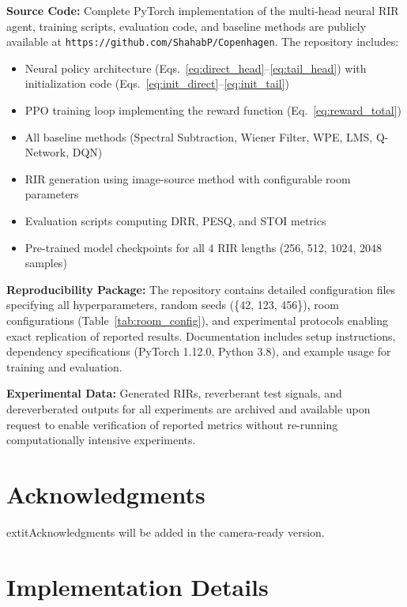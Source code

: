 \documentclass[12pt,a4paper]{article}
\begin{document}
\textbf{Source Code:} Complete PyTorch implementation of the multi-head neural RIR agent, training scripts, evaluation code, and baseline methods are publicly available at \texttt{https://github.com/ShahabP/Copenhagen}. The repository includes:
\begin{itemize}
\item Neural policy architecture (Eqs.~\eqref{eq:direct_head}--\eqref{eq:tail_head}) with initialization code (Eqs.~\eqref{eq:init_direct}--\eqref{eq:init_tail})
\item PPO training loop implementing the reward function (Eq.~\eqref{eq:reward_total})
\item All baseline methods (Spectral Subtraction, Wiener Filter, WPE, LMS, Q-Network, DQN)
\item RIR generation using image-source method with configurable room parameters
\item Evaluation scripts computing DRR, PESQ, and STOI metrics
\item Pre-trained model checkpoints for all 4 RIR lengths (256, 512, 1024, 2048 samples)
\end{itemize}

\textbf{Reproducibility Package:} The repository contains detailed configuration files specifying all hyperparameters, random seeds (\{42, 123, 456\}), room configurations (Table~\ref{tab:room_config}), and experimental protocols enabling exact replication of reported results. Documentation includes setup instructions, dependency specifications (PyTorch 1.12.0, Python 3.8), and example usage for training and evaluation.

\textbf{Experimental Data:} Generated RIRs, reverberant test signals, and dereverberated outputs for all experiments are archived and available upon request to enable verification of reported metrics without re-running computationally intensive experiments.

\section*{Acknowledgments}

                        extit{Acknowledgments will be added in the camera-ready version.}

\appendix

\section{Implementation Details}
\end{document}
